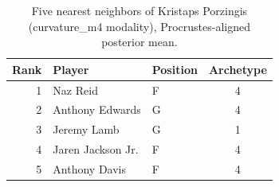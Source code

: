 \begin{table}[htbp]
  \centering\small
  \begin{tabular}{rllc}
    \toprule
    Rank & Player & Position & Archetype \\
    \midrule
    1 & Naz Reid & F & 4 \\
    2 & Anthony Edwards & G & 4 \\
    3 & Jeremy Lamb & G & 1 \\
    4 & Jaren Jackson Jr. & F & 4 \\
    5 & Anthony Davis & F & 4 \\
    \bottomrule
  \end{tabular}
  \caption{Five nearest neighbors of Kristaps Porzingis (curvature_m4 modality), Procrustes-aligned posterior mean.}
  \label{tab:Kristaps_Porzingis_neighbors_curvature_m4}
\end{table}

